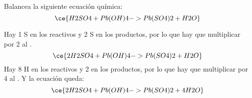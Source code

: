 Balancea la siguiente ecuación química:
\[\ce{H2SO4 + Pb(OH)4 -> Pb(SO4)2 + H2O}\]
\begin{solutionbox}{4.2cm}
    Hay 1 S en los reactivos y 2 S en los productos, por lo que hay que multiplicar por 2 al .
    \[ \ce{2H2SO4 + Pb(OH)4 -> Pb(SO4)2 + H2O} \]
    Hay 8 H en los reactivos y 2 en los productos, por lo que hay que multiplicar por 4 al . Y la ecuación queda:
    \[ \ce{2H2SO4 + Pb(OH)4 -> Pb(SO4)2 + 4H2O}\]
\end{solutionbox}